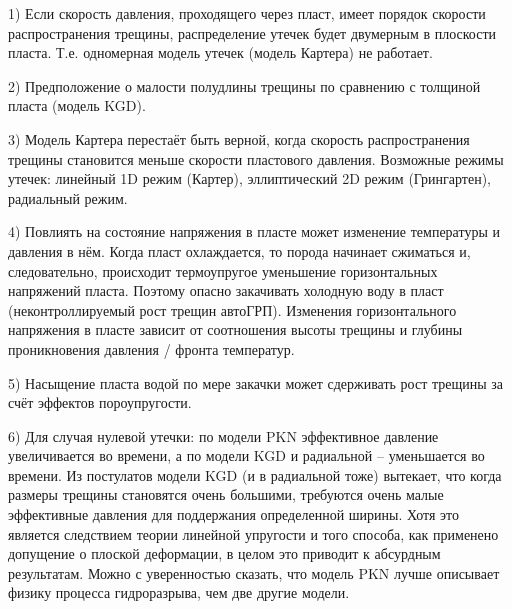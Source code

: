 \documentclass[a4paper, 12pt]{article}
\begin{document}
1) Если скорость давления, проходящего через пласт, имеет порядок скорости распространения трещины, распределение утечек будет двумерным в плоскости пласта. Т.е. одномерная модель утечек (модель Картера) не работает.

2) Предположение о малости полудлины трещины по сравнению с толщиной пласта (модель KGD).

3) Модель Картера перестаёт быть верной, когда скорость распространения трещины становится меньше скорости пластового давления.
Возможные режимы утечек: линейный 1D режим (Картер), эллиптический 2D режим (Грингартен), радиальный режим.

4) Повлиять на состояние напряжения в пласте может изменение температуры и давления в нём.
Когда пласт охлаждается, то порода начинает сжиматься и, следовательно, происходит термоупругое уменьшение горизонтальных напряжений пласта.
Поэтому опасно закачивать холодную воду в пласт (неконтроллируемый рост трещин автоГРП).
Изменения горизонтального напряжения в пласте зависит от соотношения высоты трещины и глубины проникновения давления / фронта температур.

5) Насыщение пласта водой по мере закачки может сдерживать рост трещины за счёт эффектов пороупругости.

6) Для случая нулевой утечки: по модели PKN эффективное давление увеличивается во времени, а по модели KGD и радиальной -- уменьшается во времени.
Из постулатов модели KGD (и в радиальной тоже) вытекает, что когда размеры трещины становятся очень большими, требуются очень малые эффективные давления для поддержания определенной ширины.
Хотя это является следствием теории линейной упругости и того способа, как применено допущение о плоской деформации, в целом это приводит к абсурдным результатам.
Можно с уверенностью сказать, что модель PKN лучше описывает физику процесса гидроразрыва, чем две другие модели.
\end{document}

